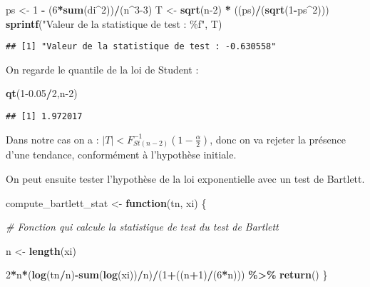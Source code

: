 \documentclass[
]{article}
\newenvironment{Shaded}{\begin{snugshade}}{\end{snugshade}}
\newcommand{\CommentTok}[1]{\textcolor[rgb]{0.56,0.35,0.01}{\textit{#1}}}
\newcommand{\ControlFlowTok}[1]{\textcolor[rgb]{0.13,0.29,0.53}{\textbf{#1}}}
\newcommand{\DecValTok}[1]{\textcolor[rgb]{0.00,0.00,0.81}{#1}}
\newcommand{\FloatTok}[1]{\textcolor[rgb]{0.00,0.00,0.81}{#1}}
\newcommand{\FunctionTok}[1]{\textcolor[rgb]{0.13,0.29,0.53}{\textbf{#1}}}
\newcommand{\NormalTok}[1]{#1}
\newcommand{\OtherTok}[1]{\textcolor[rgb]{0.56,0.35,0.01}{#1}}
\newcommand{\SpecialCharTok}[1]{\textcolor[rgb]{0.81,0.36,0.00}{\textbf{#1}}}
\newcommand{\StringTok}[1]{\textcolor[rgb]{0.31,0.60,0.02}{#1}}
\begin{document}
\begin{Shaded}
\begin{Highlighting}[]
\NormalTok{ps }\OtherTok{\textless{}{-}} \DecValTok{1} \SpecialCharTok{{-}}\NormalTok{ (}\DecValTok{6}\SpecialCharTok{*}\FunctionTok{sum}\NormalTok{(di}\SpecialCharTok{\^{}}\DecValTok{2}\NormalTok{))}\SpecialCharTok{/}\NormalTok{(n}\SpecialCharTok{\^{}}\DecValTok{3{-}3}\NormalTok{)}
\NormalTok{T }\OtherTok{\textless{}{-}} \FunctionTok{sqrt}\NormalTok{(n}\DecValTok{{-}2}\NormalTok{) }\SpecialCharTok{*}\NormalTok{ ((ps)}\SpecialCharTok{/}\NormalTok{(}\FunctionTok{sqrt}\NormalTok{(}\DecValTok{1}\SpecialCharTok{{-}}\NormalTok{ps}\SpecialCharTok{\^{}}\DecValTok{2}\NormalTok{)))}
\FunctionTok{sprintf}\NormalTok{(}\StringTok{"Valeur de la statistique de test : \%f"}\NormalTok{, T)}
\end{Highlighting}
\end{Shaded}

\begin{verbatim}
## [1] "Valeur de la statistique de test : -0.630558"
\end{verbatim}

On regarde le quantile de la loi de Student :

\begin{Shaded}
\begin{Highlighting}[]
\FunctionTok{qt}\NormalTok{(}\DecValTok{1}\FloatTok{{-}0.05}\SpecialCharTok{/}\DecValTok{2}\NormalTok{,n}\DecValTok{{-}2}\NormalTok{)}
\end{Highlighting}
\end{Shaded}

\begin{verbatim}
## [1] 1.972017
\end{verbatim}

Dans notre cas on a :
\(|T|<F_{St(n-2)}^{-1} \left(1-\frac{\alpha}{2} \right)\), donc on va
rejeter la présence d'une tendance, conformément à l'hypothèse initiale.

On peut ensuite tester l'hypothèse de la loi exponentielle avec un test
de Bartlett.

\begin{Shaded}
\begin{Highlighting}[]
\NormalTok{compute\_bartlett\_stat }\OtherTok{\textless{}{-}} \ControlFlowTok{function}\NormalTok{(tn, xi) \{}
  
  \CommentTok{\# Fonction qui calcule la statistique de test du test de Bartlett}
  
\NormalTok{  n }\OtherTok{\textless{}{-}} \FunctionTok{length}\NormalTok{(xi)}
  
  \DecValTok{2}\SpecialCharTok{*}\NormalTok{n}\SpecialCharTok{*}\NormalTok{(}\FunctionTok{log}\NormalTok{(tn}\SpecialCharTok{/}\NormalTok{n)}\SpecialCharTok{{-}}\FunctionTok{sum}\NormalTok{(}\FunctionTok{log}\NormalTok{(xi))}\SpecialCharTok{/}\NormalTok{n)}\SpecialCharTok{/}\NormalTok{(}\DecValTok{1}\SpecialCharTok{+}\NormalTok{((n}\SpecialCharTok{+}\DecValTok{1}\NormalTok{)}\SpecialCharTok{/}\NormalTok{(}\DecValTok{6}\SpecialCharTok{*}\NormalTok{n))) }\SpecialCharTok{\%\textgreater{}\%} \FunctionTok{return}\NormalTok{()}
\NormalTok{\}}
\end{Highlighting}
\end{Shaded}
\end{document}
